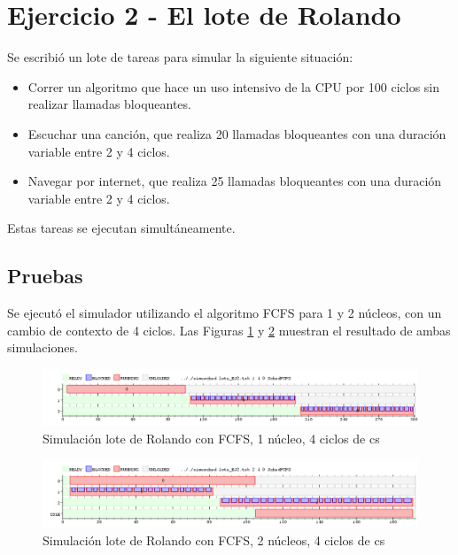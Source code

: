 \section{Ejercicio 2 - El lote de Rolando}

Se escribió un lote de tareas para simular la siguiente situación:

\begin{itemize}
	\item Correr un algoritmo que hace un uso intensivo de la CPU por 100 ciclos sin realizar llamadas bloqueantes.
	\item Escuchar una canción, que realiza 20 llamadas bloqueantes con una duración variable entre 2 y 4 ciclos.
	\item Navegar por internet, que realiza 25 llamadas bloqueantes con una duración variable entre 2 y 4 ciclos.
\end{itemize}

Estas tareas se ejecutan simultáneamente.

\subsection{Pruebas}

Se ejecutó el simulador utilizando el algoritmo FCFS para 1 y 2 núcleos, con un cambio de contexto de 4 ciclos.  Las Figuras \ref{fig-rol1core} y \ref{fig-rol2core} muestran el resultado de ambas simulaciones.

\begin{figure}[!htb]
\begin{center}
  \includegraphics[scale=0.45]{imagenes/ej2-1core.png}
\end{center}
\caption{Simulación lote de Rolando con FCFS, 1 núcleo, 4 ciclos de cs}\label{fig-rol1core}
\end{figure}

\begin{figure}[!htb]
\begin{center}
  \includegraphics[scale=0.45]{imagenes/ej2-2core.png}
\end{center}
\caption{Simulación lote de Rolando con FCFS, 2 núcleos, 4 ciclos de cs}\label{fig-rol2core}
\end{figure}

